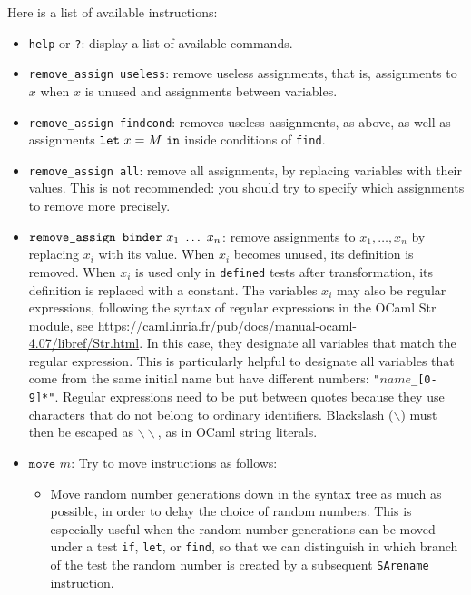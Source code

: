 \documentclass{article}
\begin{document}
Here is a list of available instructions:
\begin{itemize}

\item \texttt{help} or \texttt{?}: display a list of available commands.

\item \texttt{remove\string_assign useless}: remove useless assignments,
that is, assignments to $x$ when $x$ is unused and assignments
between variables.

\item \texttt{remove\string_assign findcond}: removes useless assignments,
as above, as well as assignments ${\tt let}\ x = M\ {\tt in}$ inside
conditions of {\tt find}. 

\item \texttt{remove\string_assign all}: remove all assignments,
by replacing variables with their values. This is not recommended:
you should try to specify which assignments to remove more precisely.

\item $\texttt{remove\string_assign binder}\ x_1\ \dots\ x_n$: remove assignments
to $x_1, \ldots, x_n$ by replacing $x_i$ with its value. When $x_i$ becomes unused,
its definition is removed. When $x_i$ is used only in \texttt{defined} 
tests after transformation, its definition is replaced with 
a constant. The variables $x_i$ may also be regular expressions, 
following the syntax of regular expressions in the OCaml Str module, see
  \url{https://caml.inria.fr/pub/docs/manual-ocaml-4.07/libref/Str.html}.
In this case, they designate all variables that match the regular expression.
This is particularly helpful to designate all variables that come
from the same initial name but have different numbers:
\texttt{"$\mathit{name}$\_[0-9]*"}. Regular expressions 
need to be put between quotes because they use characters that do
not belong to ordinary identifiers. Blackslash ($\backslash$) must then be escaped 
as $\backslash\backslash$, as in OCaml string literals.

\item $\texttt{move }m$: Try to move instructions as follows:
\begin{itemize}

\item Move random number generations down in the syntax tree as much
  as possible, in order to delay the choice of random numbers. This is
  especially useful when the random number generations can be moved
  under a test {\tt if}, {\tt let}, or {\tt find}, so that we can
  distinguish in which branch of the test the random number is created
  by a subsequent \texttt{SArename} instruction.


\end{itemize}
\end{itemize}
\end{document}
